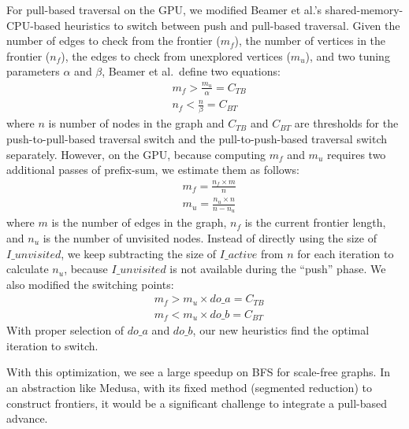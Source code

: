 \documentclass[format=acmsmall,review=false,screen=true]{acmart}
\begin{document}
For pull-based traversal on the GPU, we modified Beamer et al.'s
shared-memory-CPU-based heuristics to switch between push and
pull-based traversal. Given the number of edges to check from the
frontier ($m_f$), the number of vertices in the frontier ($n_f$), the
edges to check from unexplored vertices ($m_u$), and two tuning
parameters $\alpha$ and $\beta$, Beamer et al.\ define two equations:
\begin{align}
    & m_f > \frac{m_u}{\alpha} = C_{TB} \\
    & n_f < \frac{n}{\beta} = C_{BT}
\end{align}
where $n$ is number of nodes in the graph and $C_{TB}$ and $C_{BT}$
are thresholds for the push-to-pull-based traversal switch and the
pull-to-push-based traversal switch separately. However, on the GPU,
because computing $m_f$ and $m_u$ requires two additional passes of
prefix-sum, we estimate them as follows:
\begin{align}
    & m_f = \frac{n_f \times m}{n} \\
    & m_u = \frac{n_u \times n}{n - n_u}
\end{align}
where $m$ is the number of edges in the graph, $n_f$ is the current
frontier length, and $n_u$ is the number of unvisited nodes. Instead
of directly using the size of $I\_unvisited$, we keep subtracting the
size of $I\_active$ from $n$ for each iteration to calculate $n_u$,
because $I\_unvisited$ is not available during the ``push'' phase. We
also modified the switching points:
\begin{align}
    & m_f > m_u \times do\_a = C_{TB} \\
    & m_f < m_u \times do\_b = C_{BT}
\end{align}
With proper selection of $do\_a$ and $do\_b$, our new heuristics find
the optimal iteration to switch.

With this optimization, we see a large speedup on BFS for scale-free
graphs. In an abstraction like Medusa, with its fixed method
(segmented reduction) to construct frontiers, it would be a
significant challenge to integrate a pull-based advance.
\end{document}
